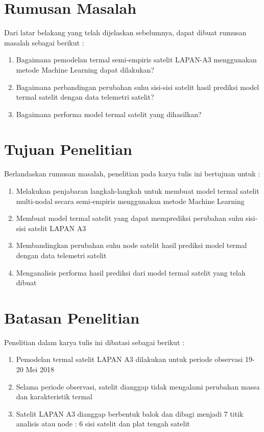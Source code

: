 \section{Rumusan Masalah}

Dari latar belakang yang telah dijelaskan sebelumnya, dapat dibuat rumusan masalah sebagai berikut :

\begin{enumerate}
\item Bagaimana pemodelan termal semi-empiris satelit LAPAN-A3 menggunakan metode Machine Learning dapat dilakukan?
\item Bagaimana perbandingan perubahan suhu sisi-sisi satelit hasil prediksi model termal satelit dengan data telemetri satelit?
\item Bagaimana performa model termal satelit yang dihasilkan?
\end{enumerate}

\section{Tujuan Penelitian}

Berlandaskan rumusan masalah, penelitian pada karya tulis ini bertujuan untuk :

\begin{enumerate}
\item Melakukan penjabaran langkah-langkah untuk membuat model termal satelit multi-nodal secara semi-empiris menggunakan metode Machine Learning
\item Membuat model termal satelit yang dapat memprediksi perubahan suhu sisi-sisi satelit LAPAN A3
\item Membandingkan perubahan suhu node satelit hasil prediksi model termal dengan data telemetri satelit
\item Menganalisis performa hasil prediksi dari model termal satelit yang telah dibuat
\end{enumerate}

\section{Batasan Penelitian}

Penelitian dalam karya tulis ini dibatasi sebagai berikut :

\begin{enumerate}
\item Pemodelan termal satelit LAPAN A3 dilakukan untuk periode observasi 19-20 Mei 2018
\item Selama periode observasi, satelit dianggap tidak mengalami perubahan massa dan karakteristik termal
\item Satelit LAPAN A3 dianggap berbentuk balok dan dibagi menjadi 7 titik analisis atau node : 6 sisi satelit dan plat tengah satelit
\end{enumerate}

